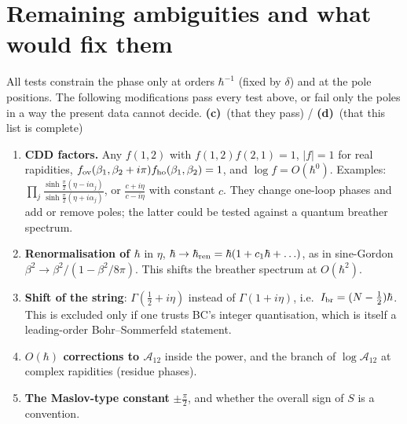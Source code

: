 \documentclass[11pt,a4paper]{article}
\newcommand{\Lc}{\textsf{\textbf{(c)}}}
\newcommand{\Ld}{\textsf{\textbf{(d)}}}
\theoremstyle{remark}\newtheorem{remark}[proposition]{Remark}
\newcommand{\cA}{\mathcal A}
\begin{document}
\section{Remaining ambiguities and what would fix them}
All tests constrain the phase only at orders $\hbar^{-1}$ (fixed by $\delta$) and at the pole positions. The following modifications pass every test above, or fail only the poles in a way the present data cannot decide. \Lc\ (that they pass) / \Ld\ (that this list is complete)
\begin{enumerate}
\item \textbf{CDD factors.} Any $f(1,2)$ with $f(1,2)f(2,1)=1$, $|f|=1$ for real rapidities, $f_{\rm ov}(\beta_1,\beta_2+i\pi)f_{\rm ho}(\beta_1,\beta_2)=1$, and $\log f=O(\hbar^0)$. Examples: $\prod_j\frac{\sinh\frac{\pi}{2}(\eta-i\alpha_j)}{\sinh\frac{\pi}{2}(\eta+i\alpha_j)}$, or $\frac{c+i\eta}{c-i\eta}$ with constant $c$. They change one-loop phases and add or remove poles; the latter could be tested against a quantum breather spectrum.
\item \textbf{Renormalisation of $\hbar$} in $\eta$, $\hbar\to\hbar_{\rm ren}=\hbar(1+c_1\hbar+\ldots)$, as in sine-Gordon $\beta^2\to\beta^2/(1-\beta^2/8\pi)$. This shifts the breather spectrum at $O(\hbar^2)$.
\item \textbf{Shift of the string}: $\Gamma(\tfrac12+i\eta)$ instead of $\Gamma(1+i\eta)$, i.e.\ $I_{\rm br}=(N-\tfrac12)\hbar$. This is excluded only if one trusts BC's integer quantisation, which is itself a leading-order Bohr--Sommerfeld statement.
\item \textbf{$O(\hbar)$ corrections to $\cA_{12}$} inside the power, and the branch of $\log\cA_{12}$ at complex rapidities (residue phases).
\item \textbf{The Maslov-type constant} $\pm\tfrac\pi2$, and whether the overall sign of $S$ is a convention.
\end{enumerate}
\end{document}
